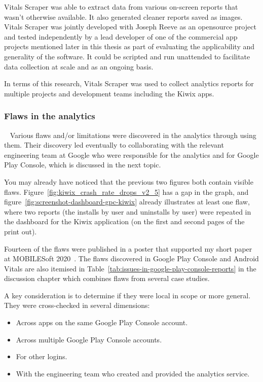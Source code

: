 Vitals Scraper was able to extract data from various on-screen reports that wasn't otherwise available. It also generated cleaner reports saved as images. Vitals Scraper was jointly developed with Joseph Reeve as an opensource project and tested independently by a lead developer of one of the commercial app projects mentioned later in this thesis as part of evaluating the applicability and generality of the software. It could be scripted and run unattended to facilitate data collection at scale and as an ongoing basis.

In terms of this research, Vitals Scraper was used to collect analytics reports for multiple projects and development teams including the Kiwix apps. 


\subsubsection{Flaws in the analytics}~\label{section-flaws-in-the-analytics}
Various flaws and/or limitations were discovered in the analytics through using them. Their discovery led eventually to collaborating with the relevant engineering team at Google who were responsible for the analytics and for Google Play Console, which is discussed in the next topic.

You may already have noticed that the previous two figures both contain visible flaws. Figure~\ref{fig:kiwix_crash_rate_drops_v2_5} has a gap in the graph, and figure~\ref{fig:screenshot-dashboard-gpc-kiwix} already illustrates at least one flaw, where two reports (the installs by user and uninstalls by user) were repeated in the dashboard for the Kiwix application (on the first and second pages of the print out). 

Fourteen of the flaws were published in a poster that supported my short paper at MOBILESoft 2020~\citep{harty_improving_app_quality_despite_flawed_mobile_analytics}. The flaws discovered in Google Play Console and Android Vitals are also itemised in Table~\ref{tab:issues-in-google-play-console-reports} in the discussion chapter which combines flaws from several case studies.

A key consideration is to determine if they were local in scope or more general. They were cross-checked in several dimensions:
\begin{itemize}
    \item Across apps on the same Google Play Console account.
    \item Across multiple Google Play Console accounts.
    \item For other logins.
    \item With the engineering team who created and provided the analytics service. 
\end{itemize}

